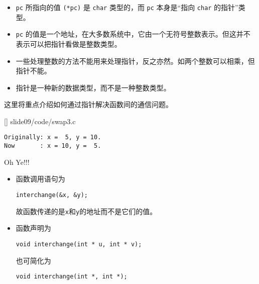 \begin{frame}[fragile]
\begin{itemize}
\item
\lstinline|pc| 所指向的值 \lstinline|(*pc)| 是 \lstinline|char| 类型的，而 \lstinline|pc| 本身是“指向 \lstinline|char| 的指针”类型。\\[0.1in]
\item 
\lstinline|pc| 的值是一个地址，在大多数系统中，它由一个无符号整数表示。但这并不表示可以把指针看做是整数类型。\\[0.1in]
\item 
一些处理整数的方法不能用来处理指针，反之亦然。如两个整数可以相乘，但指针不能。\\[0.1in]
\item 
指针是一种新的数据类型，而不是一种整数类型。
\end{itemize}
\end{frame}

\begin{frame}[fragile]
这里将重点介绍如何通过指针解决函数间的通信问题。
\end{frame}

\begin{frame}
  
  []
  {slide09/code/swap3.c}
\end{frame}

\begin{frame}[fragile]\ft{\secname}
\begin{lstlisting}[backgroundcolor=\color{blue!10}]
Originally: x =  5, y = 10.
Now       : x = 10, y =  5.
\end{lstlisting}
\pause \vspace{0.1in}

\begin{center}
{\Large Oh Ye!!!}
\end{center}
\end{frame}

\begin{frame}[fragile]
\begin{itemize}
\item 
函数调用语句为
\begin{lstlisting}[backgroundcolor=\color{blue!10}]
interchange(&x, &y);
\end{lstlisting}
故函数传递的是\lstinline|x|和\lstinline|y|的地址而不是它们的值。\\[0.15in]
\item 
函数声明为
\begin{lstlisting}[backgroundcolor=\color{blue!10}]
void interchange(int * u, int * v);
\end{lstlisting}
也可简化为
\begin{lstlisting}[backgroundcolor=\color{blue!10}]
void interchange(int *, int *);
\end{lstlisting}
\end{itemize}
\end{frame}

